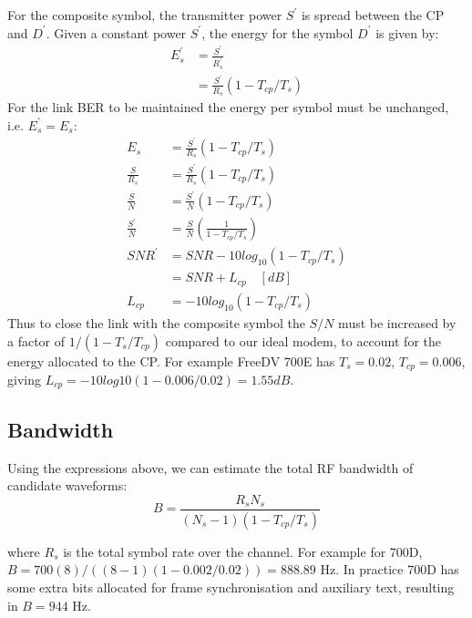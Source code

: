 \documentclass{article}
\begin{document}
For the composite symbol, the transmitter power $S^\prime$ is spread between the CP and $D^\prime$.  Given a constant power $S^\prime$, the energy for the symbol $D^\prime$ is given by:
\begin{equation}
\begin{split}
E^\prime_s &= \frac{S^\prime}{R^\prime_s}  \\
           &= \frac{S^\prime}{R_s}(1 - T_{cp}/T_s)
\end{split}
\end{equation}
For the link BER to be maintained the energy per symbol must be unchanged, i.e. $E^\prime_s=E_s$:
\begin{equation}
\begin{split}
E_s           &= \frac{S^\prime}{R_s}(1 - T_{cp}/T_s) \\
\frac{S}{R_s} &= \frac{S^\prime}{R_s}(1 - T_{cp}/T_s) \\
\frac{S}{N} &= \frac{S^\prime}{N}(1 - T_{cp}/T_s) \\
\frac{S^\prime}{N} &= \frac{S}{N}\left(\frac{1}{1 - T_{cp}/T_s}\right) \\
SNR^\prime  &= SNR - 10log_{10}(1-T_{cp}/T_s) \\
            &= SNR + L_{cp} \quad [\si{dB}] \\
     L_{cp} &= -10log_{10}(1-T_{cp}/T_s)    
\end{split}
\end{equation}
Thus to close the link with the composite symbol the $S/N$ must be increased by a factor of $1/(1 - {T_s}/T_{cp})$ compared to our ideal modem, to account for the energy allocated to the CP.  For example FreeDV 700E has $T_s=0.02$, $T_{cp}=0.006$, giving $L_{cp}=-10log10(1-0.006/0.02)=1.55 \si{dB}$.

\subsection{Bandwidth}

Using the expressions above, we can estimate the total RF bandwidth of candidate waveforms:
\begin{equation}
B = \frac{R_sN_s}{(N_s-1)(1-T_{cp}/T_s)}
\end{equation}

where $R_s$ is the total symbol rate over the channel.  For example for 700D, $B = 700(8)/((8-1)(1-0.002/0.02))=888.89$ Hz.  In practice 700D has some extra bits allocated for frame synchronisation and auxiliary text, resulting in $B=944$ Hz.
\end{document}

